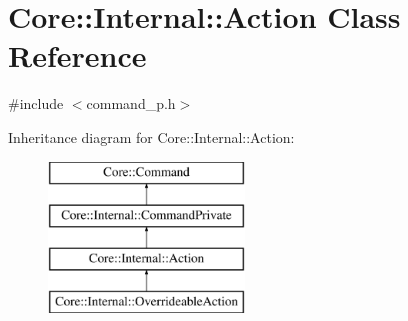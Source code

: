 \hypertarget{class_core_1_1_internal_1_1_action}{\section{\-Core\-:\-:\-Internal\-:\-:\-Action \-Class \-Reference}
\label{class_core_1_1_internal_1_1_action}
}


{\ttfamily \#include $<$command\-\_\-p.\-h$>$}

\-Inheritance diagram for \-Core\-:\-:\-Internal\-:\-:\-Action\-:\begin{figure}[H]
\begin{center}
\leavevmode
\includegraphics[height=4.000000cm]{class_core_1_1_internal_1_1_action}
\end{center}
\end{figure}
